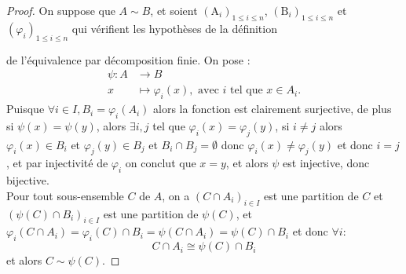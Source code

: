 \begin{proof}
  \hfill

\noindent
  On suppose que $A \sim B$, et soient $\left(\mathrm{A}_i\right)_{1\le i \le n}$, $\left(\mathrm{B}_i\right)_{1\le i \le n}$ et $\left(\varphi_i\right)_{1\le i \le n}$ qui vérifient les hypothèses de la définition \par de l'équivalence par décomposition finie. On pose :
  \begin{align*}
  \psi \colon A &\to B\\
  x &\mapsto \varphi_i(x), \text{ avec $i$ tel que $x \in A_i$}.
  \end{align*}
  Puisque $\forall i \in I, B_i = \varphi_i(A_i)$ alors la fonction est clairement surjective, de plus si $\psi(x)= \psi (y)$, alors $\exists i, j$ tel que $\varphi_i(x)=\varphi_j(y)$, si $i\ne j$ alors $\varphi_i(x) \in B_i$ et $\varphi_j(y) \in B_j$ et $B_i \cap B_j = \emptyset$ donc $\varphi_i(x)\neq \varphi_j(y)$ et donc $i=j$, et par injectivité de $\varphi_i$ on conclut que $x=y$, et alors $\psi$ est injective, donc bijective.\\
  Pour tout sous-ensemble $C$ de $A$, on a $(C\cap A_i)_{i \in I}$ est une partition de $C$ et $(\psi(C) \cap B_i)_{i \in I}$ est une partition de $\psi(C)$, et $\varphi_i(C\cap A_i)= \varphi_i(C)\cap B_i= \psi(C\cap A_i)=\psi(C)\cap B_i$ et donc $\forall i$:
   $$C\cap A_i \cong  \psi(C)\cap B_i$$ et alors $C \sim \psi(C)$.
\end{proof}

